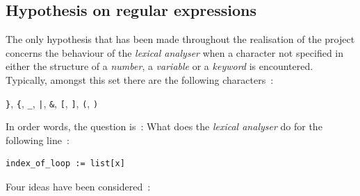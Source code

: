 \documentclass[a4paper,11pt]{article}
\begin{document}
  \subsection{Hypothesis on regular expressions}
    \label{hypothesis}
    The only hypothesis that has been made throughout the realisation of the project concerns the behaviour of the \textit{lexical analyser} when a character not specified in either the structure of a \textit{number}, a \textit{variable} or a \textit{keyword} is encountered. Typically, amongst this set there are the following characters~:
    \begin{center}
      \verb|}|, \verb|{|, \verb|_|, \verb=|=, \verb|&|, \verb|[|, \verb|]|, \verb|(|, \verb|)|
    \end{center}
    In order words, the question is~: What does the \textit{lexical analyser} do for the following line~:
    \begin{lstlisting}
index_of_loop := list[x]\end{lstlisting}
    Four ideas have been considered~:
\end{document}
